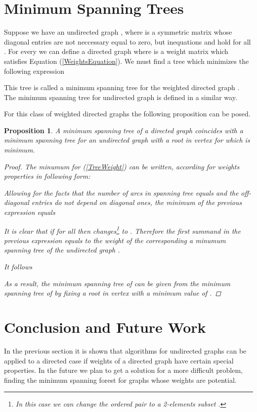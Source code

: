 \documentclass[10pt]{article}
\begin{document}
\section{Minimum Spanning Trees}
Suppose we have an undirected graph , where  is
a symmetric matrix whose diagonal entries are not neccessary equal to zero,
but inequations  and 
hold for all .  For every  we can define a directed graph
 where  is a weight matrix which satisfies Equation
(\ref{WeightsEquation}). We must find a tree  which minimizes the following 
expression

This tree is called a minimum spanning tree for the weighted directed graph
. The minimum spanning tree for undirected graph  is defined in a similar
way.

For this class of weighted directed graphs the following proposition can be
posed.
\newtheorem{teo}{Proposition}
\begin{teo}
A minimum spanning tree of a directed graph  coincides with a minimum
spanning tree for an undirected graph  with a root in vertex  for which
 is minimum.
\begin{proof}
The minumum for (\ref{TreeWeight}) can be written, according for  weights
properties in following form:

Allowing for the facts that the number of arcs in spanning tree 
equals  and the off-diagonal entries do not depend on 
diagonal ones, the minimum of the previous expression equals 

It is clear that if  for all  then
 changes\footnote{
In this case we can change the ordered pair  to a 2-elements
subset .} to .
Therefore the first summand in the previous expression equals to
the weight of the corresponding a minumum spanning tree of the undirected graph
.

It follows

As a result, the minimum spanning tree of  can be given from
the minimum spanning tree of  by fixing a root in vertex  with a minimum
value of .
\end{proof}
\end{teo}

\section{Conclusion and Future Work}
In the previous section it is shown that algorithms for undirected graphs
can be applied to a directed case if weights of a directed graph have
certain special properties. In the future we plan to get a solution for a
more difficult problem, finding the minimum spanning forest for graphs
whose weights are potential.

   
 

\end{document}
